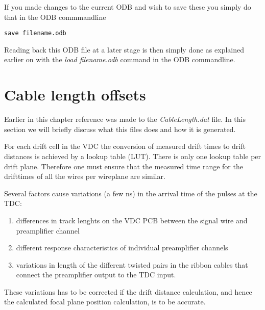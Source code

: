 \documentclass[11pt]{report}
\begin{document}
If you made changes to the current ODB and wish to save these you simply do that in the ODB commmandline
\begin{verbatim} 
save filename.odb
\end{verbatim} 
Reading back this ODB file at a later stage is then simply done as explained earlier on with the 
{\it load filename.odb} command in the ODB commandline.


\section{Cable length offsets}\label{sec:CableOffsets}

Earlier in this chapter reference was made to the {\it CableLength.dat} file.
In this section we will briefly discuss what this files does and how it is generated.

For each drift cell in the VDC the conversion of measured drift times to drift distances
is achieved by a lookup table (LUT). There is only one lookup table per drift plane. Therefore
one must ensure that the measured time range for the drifttimes of all the wires
per wireplane are similar.


Several factors cause variations (a few ns) in the arrival time of the pulses at the TDC:
\begin{enumerate}
\item differences in track lenghts on the VDC PCB between the signal wire and preamplifier channel
\item different response characteristics of individual preamplifier channels
\item variations in length of the different twisted pairs in the ribbon cables that connect the 
preamplifier output to the TDC input.
\end{enumerate}
These variations has to be corrected if the drift distance calculation, 
and hence the calculated focal plane position calculation, is to be accurate.
\end{document}
